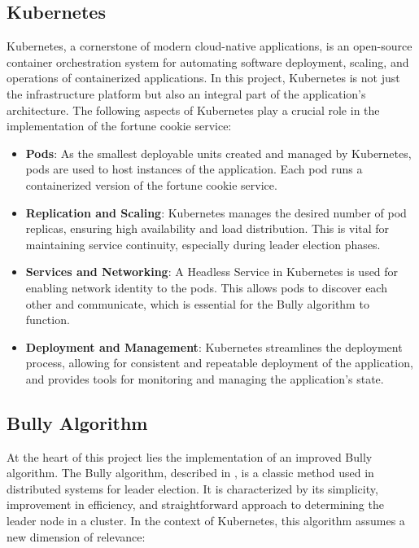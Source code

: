 \documentclass{article}
\begin{document}
  \subsection{Kubernetes}
    Kubernetes, a cornerstone of modern cloud-native applications, is an open-source container orchestration system for automating software deployment, scaling, and operations of containerized applications. In this project, Kubernetes is not just the infrastructure platform but also an integral part of the application's architecture. The following aspects of Kubernetes play a crucial role in the implementation of the fortune cookie service:
    \begin{itemize}
      \item \textbf{Pods}: As the smallest deployable units created and managed by Kubernetes, pods are used to host instances of the application. Each pod runs a containerized version of the fortune cookie service.
      \item \textbf{Replication and Scaling}: Kubernetes manages the desired number of pod replicas, ensuring high availability and load distribution. This is vital for maintaining service continuity, especially during leader election phases.
      \item \textbf{Services and Networking}: A Headless Service in Kubernetes is used for enabling network identity to the pods. This allows pods to discover each other and communicate, which is essential for the Bully algorithm to function.
      \item \textbf{Deployment and Management}: Kubernetes streamlines the deployment process, allowing for consistent and repeatable deployment of the application, and provides tools for monitoring and managing the application's state.
    \end{itemize}
  
  \subsection{Bully Algorithm}
    At the heart of this project lies the implementation of an improved Bully algorithm.
    The Bully algorithm, described in \cite{ImprovedBullyElectionAlgorithm:2014}, is a classic method used in distributed systems for leader election. It is characterized by its simplicity, improvement in efficiency, and straightforward approach to determining the leader node in a cluster. In the context of Kubernetes, this algorithm assumes a new dimension of relevance:
  
\end{document}
